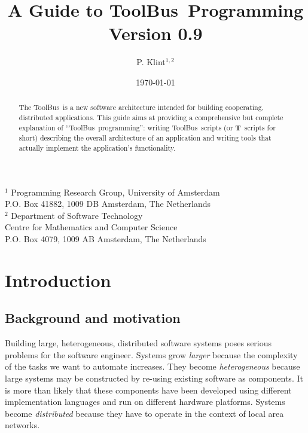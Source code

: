 \setlength{\oddsidemargin}{0.235cm}
\setlength{\evensidemargin}{0.235cm}
\setlength{\textwidth}{16cm}
\topmargin 0.5cm  %
\pagestyle{myheadings}


\newcommand{\TB}{{\sc ToolBus}}
\newcommand{\T}{{\bf T}}
\newcommand{\spec}[1]{{\rm #1}}
\newcommand{\script}[1]{{\tt #1}}
\newcommand{\ASFSDF}{{\sc Asf+Sdf}}
\newcommand{\ASF}{{\sc Asf}}
\newcommand{\SDF}{{\sc Sdf}}
\newcommand{\GEL}{{\sc Gel}}
\newcommand{\iter}{\,^*\,}
\let\emph=\em
\newcommand{\txttt}[1]{{\tt #1}}



\title{A Guide to \TB\ Programming\\
Version 0.9}
\author{P. Klint$^{1,2}$}
\date{\today}
\maketitle
\begin{center}
       {\footnotesize $^1$ Programming Research Group, University of Amsterdam\\
        P.O. Box 41882, 1009 DB Amsterdam, The Netherlands\\
        $^2$ Department of Software Technology\\
        Centre for Mathematics and Computer Science\\
        P.O. Box 4079, 1009 AB Amsterdam, The Netherlands}
\end{center}

\begin{abstract}
The \TB\ is a new software architecture intended for building
cooperating, distributed applications.  This guide aims at providing a
comprehensive but complete explanation of ``\TB\ programming'':
writing \TB{}ripts (or \T\ scripts for short) describing the overall architecture of an
application and writing tools that actually implement the application's
functionality.

\end{abstract}
\tableofcontents

\newpage

\section{Introduction}

\subsection{Background and motivation}
Building large, heterogeneous, distributed software systems poses
serious problems for the software engineer.  Systems grow {\em larger}
because the complexity of the tasks we want to automate
increases.  They become {\em heterogeneous} because large systems may be
constructed by re-using existing software as components.
It is more than likely that these components have been developed
using different implementation languages and run on different
hardware platforms.
Systems become {\em distributed} because they have to operate
in the context of local area networks.

